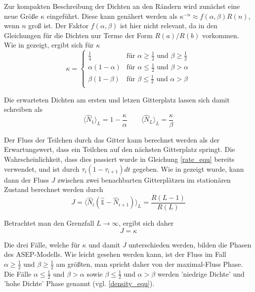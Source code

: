 \documentclass[10pt,a4paper]{report}
\begin{document}
Zur kompakten Beschreibung der Dichten an den Rändern wird zunächst eine neue Größe $\kappa$ eingeführt. Diese kann genähert werden als $\kappa^{-n}\approx f(\alpha,\beta)R(n)$, wenn $n$ groß ist. Der Faktor $f(\alpha,\beta)$ ist hier nicht relevant, da in den Gleichungen für die Dichten nur Terme der Form $R(a)/R(b)$ vorkommen. Wie in \cite{ASEP} gezeigt, ergibt sich für $\kappa$
\begin{equation}
\kappa=
\begin{cases}
\frac{1}{4}&\text{für }\alpha\geq\frac{1}{2}\text{ und }\beta\geq\frac{1}{2}\\
\alpha(1-\alpha)&\text{für }\alpha\leq\frac{1}{2}\text{ und }\beta>\alpha\\
\beta(1-\beta)&\text{für }\beta\leq\frac{1}{2}\text{ und }\alpha>\beta\\
\end{cases}
\end{equation}

Die erwarteten Dichten am ersten und letzen Gitterplatz lassen sich damit schreiben als
\begin{equation}
\langle\hat{N}_1\rangle_L=1-\frac{\kappa}{\alpha} \qquad \langle\hat{N}_L\rangle_L=\frac{\kappa}{\beta}
\end{equation}

Der Fluss der Teilchen durch das Gitter kann berechnet werden als der Erwartungswert, dass ein Teilchen auf den nächsten Gitterplatz springt. Die Wahrscheinlichkeit, dass dies passiert wurde in Gleichung \ref{rate_equ} bereits verwendet, und ist durch $\tau_i(1-\tau_{i+1})dt$ gegeben. Wie in \cite{ASEP} gezeigt wurde, kann dann der Fluss $J$ zwischen zwei benachbarten Gitterplätzen im stationären Zustand berechnet werden durch
\begin{equation}
J=\langle\hat{N}_i(\hat{\mathbb{1}}-\hat{N}_{i+1})\rangle_L=\frac{R(L-1)}{R(L)}
\end{equation}

Betrachtet man den Grenzfall $L\rightarrow\infty$, ergibt sich daher
\begin{equation}
J=\kappa
\end{equation}

Die drei Fälle, welche für $\kappa$ und damit $J$ unterschieden werden, bilden die Phasen des ASEP-Modells. Wie leicht gesehen werden kann, ist der Fluss im Fall $\alpha\geq\frac{1}{2}\text{ und }\beta\geq\frac{1}{2}$ am größten, man spricht daher von der maximal-Fluss Phase. Die Fälle $\alpha\leq\frac{1}{2}\text{ und }\beta>\alpha$ sowie $\beta\leq\frac{1}{2}\text{ und }\alpha>\beta$ werden 'niedrige Dichte' und 'hohe Dichte' Phase genannt (vgl. \ref{density_equ}). 
\end{document}
